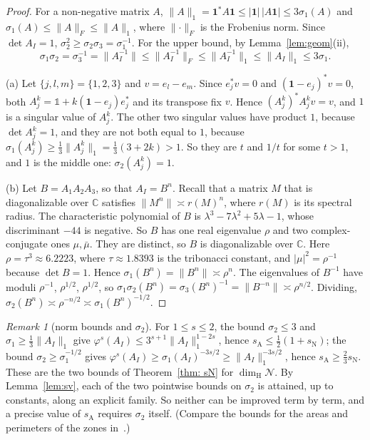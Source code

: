\documentclass[11pt]{amsart}
\newcommand{\id}{\mathds{1}}
\theoremstyle{definition}
\theoremstyle{remark}
\newtheorem{remark}[proposition]{Remark}
\newcommand{\one}{\mathbf 1}
\newcommand{\cN}{\mathcal N}
\newcommand{\sN}{s_{\mathrm N}}
\newcommand{\sA}{s_{\mathrm A}}
\newcommand{\dimH}{\dim_{\mathrm H}}
\newcommand{\abs}[1]{\lvert #1\rvert}
\newcommand{\norm}[1]{\lVert #1\rVert}
\begin{document}
\begin{proof}
For a non-negative matrix $A$, $\norm A_1=\one^*A\one\le\abs{\one}\,\abs{A\one}\le3\sigma_1(A)$
and $\sigma_1(A)\le\norm A_F\le\norm A_1$, where $\norm{\cdot}_F$ is the Frobenius norm.
Since $\det A_I=1$, $\sigma_2^2\ge\sigma_2\sigma_3=\sigma_1^{-1}$. For the upper bound,
by Lemma~\ref{lem:geom}(ii),
\[
  \sigma_1\sigma_2=\sigma_3^{-1}=\norm{A_I^{-1}}\le\norm{A_I^{-1}}_F
  \le\norm{A_I^{-1}}_1\le\norm{A_I}_1\le3\sigma_1 .
\]

(a) Let $\{j,l,m\}=\{1,2,3\}$ and $v=e_l-e_m$. Since $e_j^*v=0$ and
$(\one-e_j)^*v=0$, both $A_j^k=\id+k(\one-e_j)e_j^*$ and its transpose fix $v$.
Hence $(A_j^k)^*A_j^kv=v$, and $1$ is a singular value of $A_j^k$. The other two
singular values have product $1$, because $\det A_j^k=1$, and they are not both
equal to $1$, because $\sigma_1(A_j^k)\ge\frac13\norm{A_j^k}_1=\frac13(3+2k)>1$. So they
are $t$ and $1/t$ for some $t>1$, and $1$ is the middle one: $\sigma_2(A_j^k)=1$.

(b) Let $B=A_1A_2A_3$, so that $A_I=B^n$. Recall that a matrix $M$ that is
diagonalizable over $\mathbb C$ satisfies $\norm{M^n}\asymp r(M)^n$, where $r(M)$ is
its spectral radius. The characteristic polynomial of $B$ is
$\lambda^3-7\lambda^2+5\lambda-1$, whose discriminant $-44$ is negative. So $B$ has
one real eigenvalue $\rho$ and two complex-conjugate ones $\mu,\bar\mu$. They are
distinct, so $B$ is diagonalizable over $\mathbb C$. Here $\rho=\tau^3\approx6.2223$,
where $\tau\approx1.8393$ is the tribonacci constant, and $\abs\mu^2=\rho^{-1}$ because
$\det B=1$. Hence $\sigma_1(B^n)=\norm{B^n}\asymp\rho^n$. The eigenvalues of
$B^{-1}$ have moduli $\rho^{-1}$, $\rho^{1/2}$, $\rho^{1/2}$, so
$\sigma_1\sigma_2(B^n)=\sigma_3(B^n)^{-1}=\norm{B^{-n}}\asymp\rho^{n/2}$. Dividing,
$\sigma_2(B^n)\asymp\rho^{-n/2}\asymp\sigma_1(B^n)^{-1/2}$.
\end{proof}

\begin{remark}[norm bounds and $\sigma_2$]\label{rem:ceiling}
For $1\le s\le2$, the bound $\sigma_2\le3$ and $\sigma_1\ge\frac13\norm{A_I}_1$ give
$\varphi^s(A_I)\le3^{s+1}\norm{A_I}_1^{1-2s}$, hence $\sA\le\frac12(1+\sN)$; the bound $\sigma_2\ge\sigma_1^{-1/2}$ gives
$\varphi^s(A_I)\ge\sigma_1(A_I)^{-3s/2}\ge\norm{A_I}_1^{-3s/2}$, hence $\sA\ge\frac23\sN$.
These are the two bounds of Theorem~\ref{thm: sN} for $\dimH\cN$.
By Lemma~\ref{lem:sv}, each of the two pointwise bounds on $\sigma_2$ is attained, up to constants,
along an explicit family. So neither can be improved term by term, and a precise value of $\sA$ requires $\sigma_2$ itself. (Compare the bounds for the areas and perimeters of the zones in~\cite[Prop.~9]{DD09}.)
\end{remark}
\end{document}
